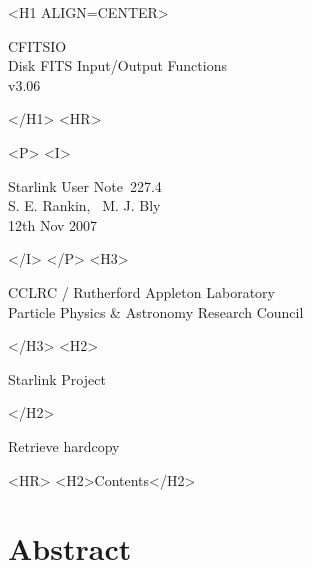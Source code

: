 \documentclass[twoside,11pt]{article}
\newcommand{\stardoccategory}  {Starlink User Note}
\newcommand{\stardocsource}    {sun\stardocnumber}
\newcommand{\stardocnumber}    {227.4}
\newcommand{\stardocauthors}   {S. E. Rankin, \, M. J. Bly}
\newcommand{\stardocdate}      {12th Nov 2007}
\newcommand{\stardoctitle}     {CFITSIO \\[2ex]
                                Disk FITS Input/Output Functions}
\newcommand{\stardocversion}   {v3.06}
\newcommand{\htmladdnormallink}[2]{#1}
\newcommand{\htmladdimg}[1]{}
\newcommand{\htmlref}[2]{#1}
\newcommand{\htmladdtonavigation}[1]{}
\newcommand{\xlabel}[1]{}
\renewcommand{\_}{\texttt{\symbol{95}}}
\begin{document}
\begin{htmlonly}
   \xlabel{}
   \begin{rawhtml} <H1 ALIGN=CENTER> \end{rawhtml}
      \stardoctitle\\
      \stardocversion\\
   \begin{rawhtml} </H1> <HR> \end{rawhtml}


   \begin{rawhtml} <P> <I> \end{rawhtml}
   \stardoccategory\ \stardocnumber \\
   \stardocauthors \\
   \stardocdate
   \begin{rawhtml} </I> </P> <H3> \end{rawhtml}
      \htmladdnormallink{CCLRC}{http://www.cclrc.ac.uk} /
      \htmladdnormallink{Rutherford Appleton Laboratory}
                        {http://www.cclrc.ac.uk/ral} \\
      \htmladdnormallink{Particle Physics \& Astronomy Research Council}
                        {http://www.pparc.ac.uk} \\
   \begin{rawhtml} </H3> <H2> \end{rawhtml}
      \htmladdnormallink{Starlink Project}{http://www.starlink.ac.uk/}
   \begin{rawhtml} </H2> \end{rawhtml}
   \htmladdnormallink{\htmladdimg{source.gif} Retrieve hardcopy}
      {http://www.starlink.rl.ac.uk/cgi-bin/hcserver?\stardocsource}\\

  \label{stardoccontents}
  \begin{rawhtml} 
    <HR>
    <H2>Contents</H2>
  \end{rawhtml}
  \htmladdtonavigation{\htmlref{\htmladdimg{contents_motif.gif}}
        {stardoccontents}}

  \section{\xlabel{abstract}Abstract}
\end{htmlonly}
\end{document}
